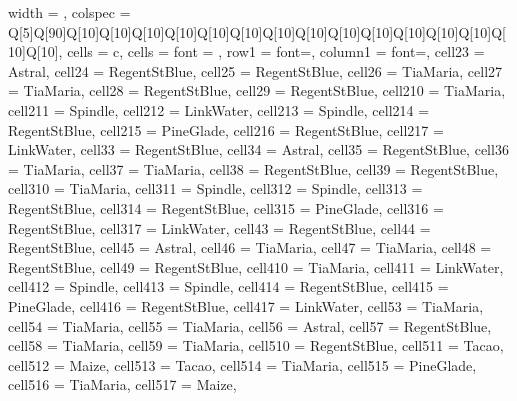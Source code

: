 \begin{table}
\begin{tblr}[
  label = none,
  entry = none,
]{
  width = \linewidth,
  colspec = {Q[5]Q[90]Q[10]Q[10]Q[10]Q[10]Q[10]Q[10]Q[10]Q[10]Q[10]Q[10]Q[10]Q[10]Q[10]Q[10]Q[10]},
  cells = {c},
  cells = {font = \footnotesize},
  row{1} = {font=\bfseries\footnotesize},
  column{1} = {font=\bfseries\footnotesize},
  cell{2}{3} = {Astral},
  cell{2}{4} = {RegentStBlue},
  cell{2}{5} = {RegentStBlue},
  cell{2}{6} = {TiaMaria},
  cell{2}{7} = {TiaMaria},
  cell{2}{8} = {RegentStBlue},
  cell{2}{9} = {RegentStBlue},
  cell{2}{10} = {TiaMaria},
  cell{2}{11} = {Spindle},
  cell{2}{12} = {LinkWater},
  cell{2}{13} = {Spindle},
  cell{2}{14} = {RegentStBlue},
  cell{2}{15} = {PineGlade},
  cell{2}{16} = {RegentStBlue},
  cell{2}{17} = {LinkWater},
  cell{3}{3} = {RegentStBlue},
  cell{3}{4} = {Astral},
  cell{3}{5} = {RegentStBlue},
  cell{3}{6} = {TiaMaria},
  cell{3}{7} = {TiaMaria},
  cell{3}{8} = {RegentStBlue},
  cell{3}{9} = {RegentStBlue},
  cell{3}{10} = {TiaMaria},
  cell{3}{11} = {Spindle},
  cell{3}{12} = {Spindle},
  cell{3}{13} = {RegentStBlue},
  cell{3}{14} = {RegentStBlue},
  cell{3}{15} = {PineGlade},
  cell{3}{16} = {RegentStBlue},
  cell{3}{17} = {LinkWater},
  cell{4}{3} = {RegentStBlue},
  cell{4}{4} = {RegentStBlue},
  cell{4}{5} = {Astral},
  cell{4}{6} = {TiaMaria},
  cell{4}{7} = {TiaMaria},
  cell{4}{8} = {RegentStBlue},
  cell{4}{9} = {RegentStBlue},
  cell{4}{10} = {TiaMaria},
  cell{4}{11} = {LinkWater},
  cell{4}{12} = {Spindle},
  cell{4}{13} = {Spindle},
  cell{4}{14} = {RegentStBlue},
  cell{4}{15} = {PineGlade},
  cell{4}{16} = {RegentStBlue},
  cell{4}{17} = {LinkWater},
  cell{5}{3} = {TiaMaria},
  cell{5}{4} = {TiaMaria},
  cell{5}{5} = {TiaMaria},
  cell{5}{6} = {Astral},
  cell{5}{7} = {RegentStBlue},
  cell{5}{8} = {TiaMaria},
  cell{5}{9} = {TiaMaria},
  cell{5}{10} = {RegentStBlue},
  cell{5}{11} = {Tacao},
  cell{5}{12} = {Maize},
  cell{5}{13} = {Tacao},
  cell{5}{14} = {TiaMaria},
  cell{5}{15} = {PineGlade},
  cell{5}{16} = {TiaMaria},
  cell{5}{17} = {Maize},
}
\end{tblr}
\end{table}
